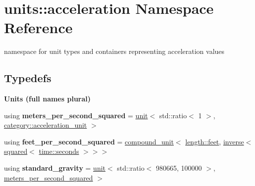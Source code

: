 \hypertarget{namespaceunits_1_1acceleration}{}\section{units\+:\+:acceleration Namespace Reference}
\label{namespaceunits_1_1acceleration}


namespace for unit types and containers representing acceleration values  


\subsection*{Typedefs}
\begin{Indent}{\bf Units (full names plural)}\par
\begin{DoxyCompactItemize}
\item 
\hypertarget{namespaceunits_1_1acceleration_ad7fc7c4f9f1f8dcbfcb3dc60e7e1091e}{}using {\bfseries meters\+\_\+per\+\_\+second\+\_\+squared} = \hyperlink{structunits_1_1unit}{unit}$<$ std\+::ratio$<$ 1 $>$, \hyperlink{namespaceunits_1_1category_a176b75b1e0ac2ee900d9c21704cd041e}{category\+::acceleration\+\_\+unit} $>$\label{namespaceunits_1_1acceleration_ad7fc7c4f9f1f8dcbfcb3dc60e7e1091e}

\item 
\hypertarget{namespaceunits_1_1acceleration_acb0fe190fa9b801748c9df9249e8e1c5}{}using {\bfseries feet\+\_\+per\+\_\+second\+\_\+squared} = \hyperlink{group___unit_types_ga9c3f6f077dc894620e1ed8358442a8f1}{compound\+\_\+unit}$<$ \hyperlink{structunits_1_1unit}{length\+::feet}, \hyperlink{group___unit_manipulators_gaacc539ef162e24b260d023d3ff949b57}{inverse}$<$ \hyperlink{group___unit_manipulators_ga636346f7898c35eb98a796bec1d77fb2}{squared}$<$ \hyperlink{structunits_1_1unit}{time\+::seconds} $>$$>$$>$\label{namespaceunits_1_1acceleration_acb0fe190fa9b801748c9df9249e8e1c5}

\item 
\hypertarget{namespaceunits_1_1acceleration_a0577f833bb41366bec2f3eb090289342}{}using {\bfseries standard\+\_\+gravity} = \hyperlink{structunits_1_1unit}{unit}$<$ std\+::ratio$<$ 980665, 100000 $>$, \hyperlink{structunits_1_1unit}{meters\+\_\+per\+\_\+second\+\_\+squared} $>$\label{namespaceunits_1_1acceleration_a0577f833bb41366bec2f3eb090289342}

\end{DoxyCompactItemize}
\end{Indent}
